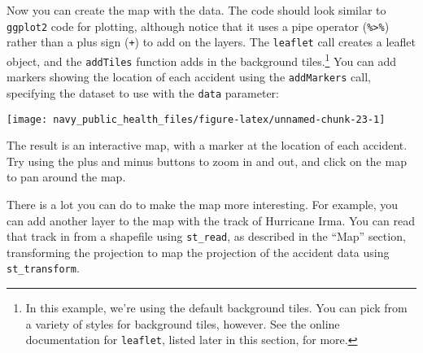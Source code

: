 \documentclass[]{tufte-book}
\newenvironment{Shaded}{}{}
\newcommand{\DataTypeTok}[1]{\textcolor[rgb]{0.56,0.13,0.00}{#1}}
\newcommand{\DecValTok}[1]{\textcolor[rgb]{0.25,0.63,0.44}{#1}}
\newcommand{\KeywordTok}[1]{\textcolor[rgb]{0.00,0.44,0.13}{\textbf{#1}}}
\newcommand{\NormalTok}[1]{#1}
\newcommand{\OperatorTok}[1]{\textcolor[rgb]{0.40,0.40,0.40}{#1}}
\newcommand{\StringTok}[1]{\textcolor[rgb]{0.25,0.44,0.63}{#1}}
\begin{document}
\begin{Shaded}
\end{Shaded}

Now you can create the map with the data. The code should look similar to \texttt{ggplot2} code for
plotting, although notice that it uses a pipe operator (\texttt{\%\textgreater{}\%}) rather than a plus sign (\texttt{+}) to
add on the layers. The \texttt{leaflet} call creates a leaflet object, and the \texttt{addTiles} function adds in
the background tiles.\footnote{In this example, we're using the default background tiles. You can pick from
  a variety of styles for background tiles, however. See the online documentation for \texttt{leaflet},
  listed later in this section, for more.} You can add markers showing the location of each accident
using the \texttt{addMarkers} call, specifying the dataset to use with the \texttt{data} parameter:

\begin{Shaded}
\end{Shaded}

\texttt{[image: navy\_public\_health\_files/figure-latex/unnamed-chunk-23-1]}

The result is an interactive map, with a marker at the location of each accident. Try using the
plus and minus buttons to zoom in and out, and click on the map to pan around the map.

There is a lot you can do to make the map more interesting. For example, you can add another layer
to the map with the track of Hurricane Irma. You can read that track in from a shapefile using
\texttt{st\_read}, as described in the ``Map'' section, transforming the projection to map the projection
of the accident data using \texttt{st\_transform}.
\end{document}
